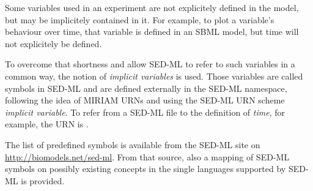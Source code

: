 Some variables used in an experiment are not explicitely defined in the model, but may be implicitely contained in it. 
For example, to plot a variable's behaviour over time, that variable is defined in an SBML model, but time will not explicitely be defined.

To overcome that shortness and allow SED-ML to refer to such variables in a common way, the notion of \emph{implicit variables} is used.
Those variables are called symbols in SED-ML and are defined externally in the \alert{SED-ML namespace}, following the idea of MIRIAM URNs and using the SED-ML URN scheme \emph{implicit variable}.
To refer from a SED-ML file to the definition of \emph{time}, for example, the URN is .

The list of predefined symbols is available from the SED-ML site on \url{http://biomodels.net/sed-ml}.
From that source, also a mapping of SED-ML symbols on possibly existing concepts in the single languages supported by SED-ML is provided.

